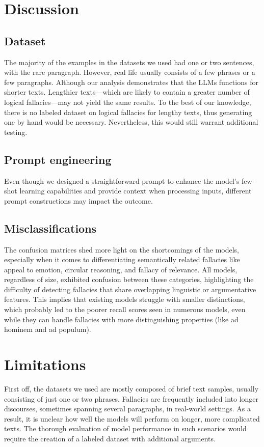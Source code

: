 \documentclass[runningheads]{llncs}
\begin{document}
\section{Discussion}
\subsection{Dataset} 
The majority of the examples in the datasets we used had one or two sentences, with the rare paragraph. However, real life usually consists of a few phrases or a few paragraphs. Although our analysis demonstrates that the LLMs functions for shorter texts. Lengthier texts—which are likely to contain a greater number of logical fallacies—may not yield the same results. To the best of our knowledge, there is no labeled dataset on logical fallacies for lengthy texts, thus generating one by hand would be necessary. Nevertheless, this would still warrant additional testing. 

\subsection{Prompt engineering}
Even though we designed a straightforward prompt to enhance the model’s few-shot learning capabilities and provide context when processing inputs, different
prompt constructions may impact the outcome. 

\subsection{Misclassifications}
The confusion matrices shed more light on the shortcomings of the models, especially when it comes to differentiating semantically related fallacies like appeal to emotion, circular reasoning, and fallacy of relevance. All models, regardless of size, exhibited confusion between these categories, highlighting the difficulty of detecting fallacies that share overlapping linguistic or argumentative features. This implies that existing models struggle with smaller distinctions, which probably led to the poorer recall scores seen in numerous models, even while they can handle fallacies with more distinguishing properties (like ad hominem and ad populum).

\section{Limitations}
First off, the datasets we used are mostly composed of brief text samples, usually consisting of just one or two phrases. Fallacies are frequently included into longer discourses, sometimes spanning several paragraphs, in real-world settings. As a result, it is unclear how well the models will perform on longer, more complicated texts. The thorough evaluation of model performance in such scenarios would require the creation of a labeled dataset with additional arguments. 
\end{document}
